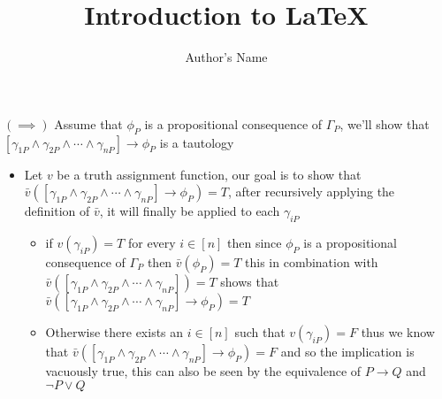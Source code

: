 \documentclass{article}
\begin{document}
\title{Introduction to \LaTeX{}}
\author{Author's Name}

\maketitle

$\left( \implies \right)$ 
Assume that $\phi _{P}$ is a propositional consequence of $\Gamma_{P}$, we'll show that $\left[ \gamma_{1P} \land \gamma_{2P}\land \dotsb \land \gamma_{nP} \right] \to \phi _{P}$ is a tautology 

\begin{itemize}
  \item Let $v$ be a truth assignment function, our goal is to show that $\bar{v}\left(\left[ \gamma_{1P} \land \gamma_{2P}\land \dotsb \land \gamma_{nP} \right] \to \phi _{P}\right) = T$, after recursively applying the definition of $\bar{v}$, it will finally be applied to each $\gamma_{iP}$ 
    \begin{itemize}
      \item if $v\left(\gamma_{iP}\right)=T$ for every $i \in \left[ n \right]$ then since $\phi _{P}$ is a propositional consequence of $\Gamma_{P}$ then $\bar{v}\left(\phi _{P}\right)=T$ this in combination with  $\bar{v}\left(\left[ \gamma_{1P} \land \gamma_{2P}\land \dotsb \land \gamma_{nP} \right]\right)=T$ shows that $\bar{v}\left(\left[ \gamma_{1P} \land \gamma_{2P}\land \dotsb \land \gamma_{nP} \right] \to \phi _{P}\right) = T$
      \item Otherwise there exists an $i \in \left[ n \right]$ such that $v\left(\gamma_{iP}\right)=F$ thus we know that $\bar{v}\left(\left[ \gamma_{1P} \land \gamma_{2P}\land \dotsb \land \gamma_{nP} \right] \to \phi _{P}\right) = F$ and so the implication is vacuously true, this can also be seen by the equivalence of $P \to Q$ and $\neg P \lor Q$ 
    \end{itemize}
\end{itemize}
\end{document}

